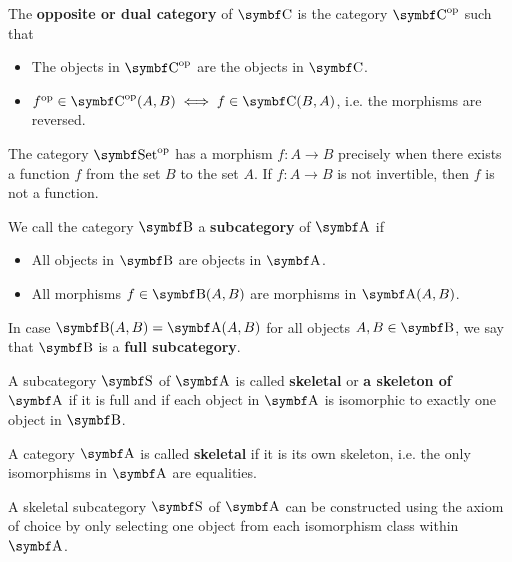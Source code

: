 \begin{definition}\label{def:opposite_category}\cite[construction 1.1.9]{Leinster2014}
  The \textbf{opposite or dual category} of \( \Bold C \) is the category \( \Bold C^{\Op} \) such that
  \begin{itemize}
    \item The objects in \( \Bold{C}^{\Op} \) are the objects in \( \Bold{C} \).
    \item \( f^{\Op} \in \Bold{C}^{\Op}(A, B) \iff f \in \Bold{C}(B, A) \), i.e. the morphisms are reversed.
  \end{itemize}
\end{definition}

\begin{example}
  The category \( \Bold{Set}^{\Op} \) has a morphism \( f: A \to B \) precisely when there exists a function \( f \) from the set \( B \) to the set \( A \). If \( f: A \to B \) is not invertible, then \( f \) is not a function.
\end{example}

\begin{definition}\label{def:subcategory}\cite[definition 1.2.18]{Leinster2014}
  We call the category \( \Bold B \) a \textbf{subcategory} of \( \Bold A \) if
  \begin{itemize}
    \item All objects in \( \Bold B \) are objects in \( \Bold A \).
    \item All morphisms \( f \in \Bold{B}(A, B) \) are morphisms in \( \Bold{A}(A, B) \).
  \end{itemize}

  In case \( \Bold{B}(A, B) = \Bold{A}(A, B) \) for all objects \( A, B \in \Bold B \), we say that \( \Bold B \) is a \textbf{full subcategory}.
\end{definition}

\begin{definition}\label{def:skeletal_category}\cite[91]{MacLane1994}
  A subcategory \( \Bold S \) of \( \Bold A \) is called \textbf{skeletal} or \textbf{a skeleton of \( \Bold A \)} if it is full and if each object in \( \Bold A \) is isomorphic to exactly one object in \( \Bold B \).

  A category \( \Bold A \) is called \textbf{skeletal} if it is its own skeleton, i.e. the only isomorphisms in \( \Bold A \) are equalities.
\end{definition}

\begin{remark}\label{remark:skeletal_subcategory_exists}
   A skeletal subcategory \( \Bold S \) of \( \Bold A \) can be constructed using the axiom of choice by only selecting one object from each isomorphism class within \( \Bold A \).
\end{remark}

